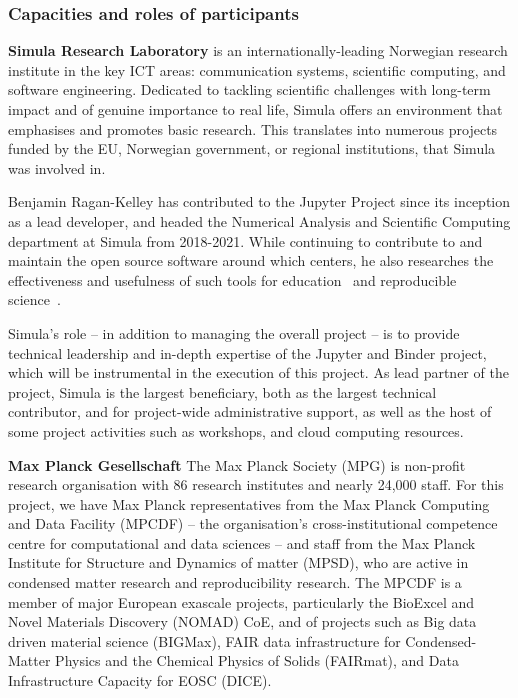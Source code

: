 \subsubsection{Capacities and roles of participants}

\noindent \textbf{Simula Research Laboratory}
 is an internationally-leading Norwegian research institute in the key
ICT areas: communication systems, scientific computing, and software
engineering. Dedicated to tackling scientific challenges with long-term impact and of
genuine importance to real life, Simula offers an environment that emphasises
and promotes basic research. This translates into numerous projects funded by
the EU, Norwegian government, or regional institutions, that Simula was
involved in.

Benjamin Ragan-Kelley has contributed to the Jupyter Project since its
inception as a lead developer, and headed the Numerical Analysis and
Scientific Computing department at Simula from 2018-2021.
While continuing to contribute to and maintain the
open source software around which \TheProject centers,
he also researches the effectiveness and usefulness of such tools for education~\cite{JupyterHub-for-education-2016}
and reproducible science~\cite{binder,Forde2018ReproducibleRE,nbval-arxiv,repo2docker-checker2020,Beg2021}.

Simula's role -- in addition to managing the overall project -- is to provide
technical leadership and in-depth expertise of the Jupyter and Binder project, which will be
instrumental in the execution of this project.
As lead partner of the project,
Simula is the largest beneficiary, both as the largest technical contributor,
and for project-wide administrative support,
as well as the host of some project activities such as workshops,
and cloud computing resources.

\noindent \textbf{Max Planck Gesellschaft}
The Max Planck Society (MPG) is non-profit research
organisation with 86 research institutes and nearly 24,000 staff. For this
project, we have Max Planck representatives from the Max Planck Computing and Data
Facility (MPCDF) -- the organisation's cross-institutional competence centre
for computational and data sciences -- and staff from the Max Planck Institute
for Structure and Dynamics of matter (MPSD), who are active in condensed matter research and
reproducibility research.
%
The MPCDF is a member of major European exascale projects, particularly the
BioExcel and Novel Materials Discovery (NOMAD) CoE, and of projects
such as Big data driven material science (BIGMax), FAIR data infrastructure for
Condensed-Matter Physics and the Chemical Physics of Solids (FAIRmat), and Data
Infrastructure Capacity for EOSC (DICE).

